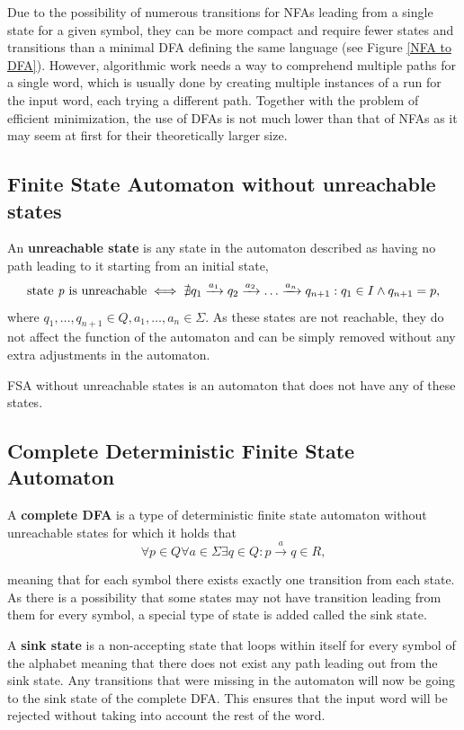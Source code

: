  Due to the possibility of numerous transitions for NFAs leading from a single state for a given symbol, they can be more compact and require fewer states and transitions than a minimal DFA defining the same language (see Figure \ref{NFA to DFA}). However, algorithmic work needs a way to comprehend multiple paths for a single word, which is usually done by creating multiple instances of a run for the input word, each trying a different path. Together with the problem of efficient minimization, the use of DFAs is not much lower than that of NFAs as it may seem at first for their theoretically larger size.

\subsection*{Finite State Automaton without unreachable states}
An \textbf{unreachable state} is any state in the automaton described as having no path leading to it starting from an initial state,
\begin{equation*}
    \text{state \textit{p} is unreachable} \iff \nexists q_1 \xrightarrow{a_1} q_2 \xrightarrow{a_2} \dots \xrightarrow{a_n} q_{n+1}: q_1 \in I \land q_{n+1} = p,
\end{equation*}
where $q_1, \dots ,q_{n+1} \in Q, a_1,\dots,a_n \in \Sigma$. As these states are not reachable, they do not affect the function of the automaton and can be simply removed without any extra adjustments in the automaton. 

FSA without unreachable states is an automaton that does not have any of these states.

\subsection*{Complete Deterministic Finite State Automaton}
A \textbf{complete DFA} is a type of deterministic finite state automaton without unreachable states for which it holds that
\begin{equation*}
    \forall p \in Q\forall a \in \Sigma \exists q \in Q: p \xrightarrow{\text{$a$}} q \in R,
\end{equation*}

meaning that for each symbol there exists exactly one transition from each state. As there is a possibility that some states may not have transition leading from them for every symbol, a special type of state is added called the sink state. 

A \textbf{sink state} is a non-accepting state that loops within itself for every symbol of the alphabet meaning that there does not exist any path leading out from the sink state. Any transitions that were missing in the automaton will now be going to the sink state of the complete DFA. This ensures that the input word will be rejected without taking into account the rest of the word.

